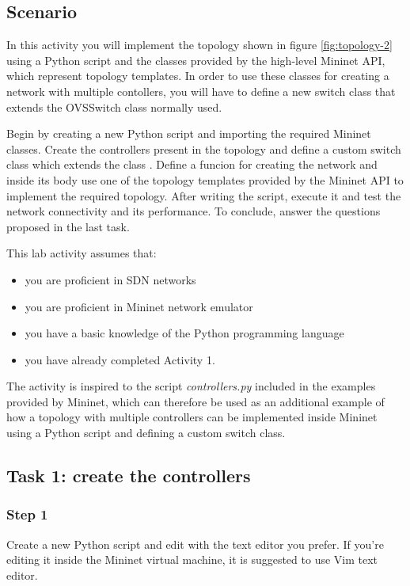 \subsection*{Scenario}
In this activity you will implement the topology shown in figure \ref{fig:topology-2} using
a Python script and the classes provided by the high-level Mininet API, which
represent topology templates. In order to use these classes for creating a network
with multiple contollers, you will have to define a new switch class that extends
the OVSSwitch class normally used.

Begin by creating a new Python script and importing the required Mininet classes.
Create the controllers present in the topology and define
a custom switch class which extends the class . Define a funcion for creating
the network and inside its body use one of the topology templates provided
by the Mininet API to implement the required topology.
After writing the script, execute it and test the network connectivity and its
performance. To conclude, answer the questions proposed in the last task.

This lab activity assumes that:
\begin{itemize}
  \item you are proficient in SDN networks
  \item you are proficient in Mininet network emulator
  \item you have a basic knowledge of the Python programming language
  \item you have already completed Activity 1.
\end{itemize}

The activity is inspired to the script \textit{controllers.py} \cite{ref-5} included in the
examples provided by Mininet, which can therefore be used as
an additional example of how a topology with multiple controllers can be implemented
inside Mininet using a Python script and defining a custom switch class.





\subsection*{Task 1: create the controllers}
\subsubsection*{Step 1}
Create a new Python script and edit with the text editor you prefer. If you're editing
it inside the Mininet virtual machine, it is suggested to use Vim text editor.

